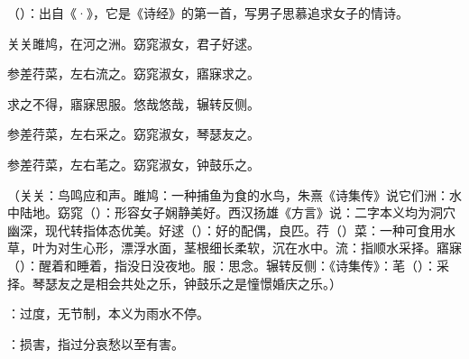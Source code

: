 {
\item {}（）：出自《·》，它是《诗经》的第一首，写男子思慕追求女子的情诗。
\begin{lyquotepoem}
关关雎鸠，在河之洲。窈窕淑女，君子好逑。

参差荇菜，左右流之。窈窕淑女，寤寐求之。

求之不得，寤寐思服。悠哉悠哉，辗转反侧。

参差荇菜，左右采之。窈窕淑女，琴瑟友之。

参差荇菜，左右芼之。窈窕淑女，钟鼓乐之。
\end{lyquotepoem}
（关关：鸟鸣应和声。雎鸠：一种捕鱼为食的水鸟，朱熹《诗集传》说它们洲：水中陆地。窈窕（）：形容女子娴静美好。西汉扬雄《方言》说：二字本义均为洞穴幽深，现代转指体态优美。好逑（）：好的配偶，良匹。荇（）菜：一种可食用水草，叶为对生心形，漂浮水面，茎根细长柔软，沉在水中。流：指顺水采择。寤寐（）：醒着和睡着，指没日没夜地。服：思念。辗转反侧：《诗集传》：芼（）：采择。琴瑟友之是相会共处之乐，钟鼓乐之是憧憬婚庆之乐。）

\item {}：过度，无节制，本义为雨水不停。

：损害，指过分哀愁以至有害。
}
{}


